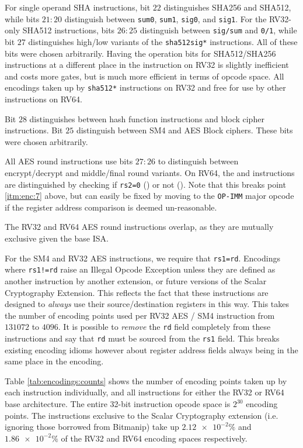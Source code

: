 For single operand SHA instructions,
bit $22$ distinguishes SHA256 and SHA512, while
bits $21:20$ distinguish between
{\tt sum0},
{\tt sum1},
{\tt sig0},
and
{\tt sig1}.
For the RV32-only SHA512 instructions,
bits $26:25$ distinguish between {\tt sig/sum} and {\tt 0/1},
while bit $27$ distinguishes high/low variants of the {\tt sha512sig*}
instructions.
All of these bits were chosen arbitrarily.
Having the operation bits for SHA512/SHA256 instructions at a different place
in the instruction on RV32 is slightly inefficient and costs more gates,
but is much more efficient in terms of opcode space.
All encodings taken up by {\tt sha512*} instructions on RV32 and
free for use by other instructions on RV64.

Bit $28$ distinguishes between hash function instructions and block
cipher instructions.
Bit $25$ distinguish between SM4 and AES Block ciphers.
These bits were chosen arbitrarily.

All AES round instructions use bits $27:26$ to distinguish between
encrypt/decrypt and middle/final round variants.
On RV64, the  and  instructions
are distinguished by checking if
{\tt rs2=0} () or not ().
Note that this breaks point \ref{itm:enc:7} above, but can easily be
fixed by moving  to the {\tt OP-IMM} major opcode
if the register address comparison is deemed un-reasonable.

The RV32 and RV64 AES round instructions overlap, as they are mutually
exclusive given the base ISA.

For the SM4 and RV32 AES instructions, we require that {\tt rs1=rd}.
Encodings where {\tt rs1!=rd} raise an Illegal Opcode Exception unless
they are defined as another instruction by another extension, or
future versions of the Scalar Cryptography Extension.
This reflects the fact that these instructions are designed to {\em always}
use their source/destination registers in this way.
This takes the number of encoding points used per RV32 AES / SM4 instruction
from $131072$ to $4096$.
It is possible to {\em remove} the {\tt rd} field completely from these
instructions and say that {\tt rd} must be sourced from the {\tt rs1}
field.
This breaks existing encoding idioms however about register address fields
always being in the same place in the encoding.


Table \ref{tab:encodings:counts} shows the number of encoding points
taken up by each instruction individually, and all instructions for either
the RV32 or RV64 base architecture.
The entire 32-bit instruction opcode space is $2^{30}$ encoding points.
The instructions exclusive to the Scalar Cryptography extension
(i.e. ignoring those borrowed from Bitmanip)
take up $\num{2.12e-2}\%$
and     $\num{1.86e-2}\%$
of the RV32 and RV64 encoding spaces respectively.

